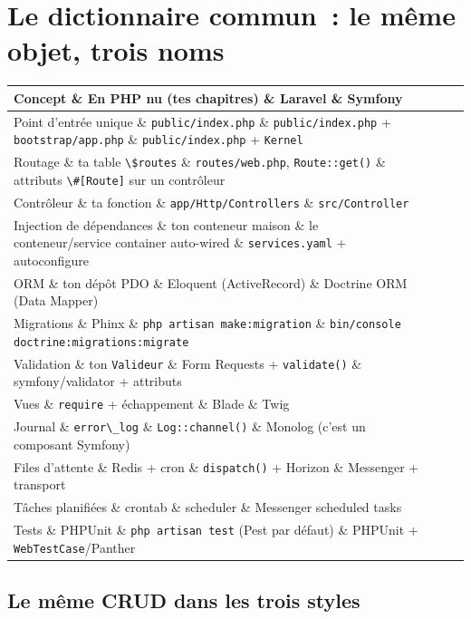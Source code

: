 \documentclass[12pt,a4paper,twoside,openright]{book}
\makeatletter
\newenvironment{tabz}[1]{\rowcolors{2}{white}{tralight}%
  \small\setlength{\tabcolsep}{5pt}\setlength{\LTpre}{3pt}\setlength{\LTpost}{3pt}%
  \begin{longtable}{@{}#1@{}}\toprule}
  {\bottomrule\end{longtable}\normalfont\setlength{\tabcolsep}{6pt}}
\newcommand{\thd}[1]{\textbf{\color{white}#1}}
\newcommand{\headrow}{\rowcolor{theadbg}}
\makeatother
\begin{document}
\section{Le dictionnaire commun~: le m\^eme objet, trois noms}

\begin{tabz}{lXXX}
  \headrow \thd{Concept} \& \thd{En PHP nu (tes chapitres)} \& \thd{Laravel} \& \thd{Symfony} \\
  \midrule
  Point d'entr\'ee unique \& \verb|public/index.php| \& \verb|public/index.php| + \verb|bootstrap/app.php| \& \verb|public/index.php| + \verb|Kernel| \\
  Routage \& ta table \verb|\$routes| \& \verb|routes/web.php|, \verb|Route::get()| \& attributs \verb|\#[Route]| sur un contr\^oleur \\
  Contr\^oleur \& ta fonction \& \verb|app/Http/Controllers| \& \verb|src/Controller| \\
  Injection de d\'ependances \& ton conteneur maison \& le conteneur/service container auto-wired \& \verb|services.yaml| + autoconfigure \\
  ORM \& ton d\'ep\^ot PDO \& Eloquent (ActiveRecord) \& Doctrine ORM (Data Mapper) \\
  Migrations \& Phinx \& \verb|php artisan make:migration| \& \verb|bin/console doctrine:migrations:migrate| \\
  Validation \& ton \verb|Valideur| \& Form Requests + \verb|validate()| \& symfony/validator + attributs \\
  Vues \& \verb|require| + \'echappement \& Blade \& Twig \\
  Journal \& \verb|error\_log| \& \verb|Log::channel()| \& Monolog (c'est un composant Symfony) \\
  Files d'attente \& Redis + cron \& \verb|dispatch()| + Horizon \& Messenger + transport \\
  T\^aches planifi\'ees \& crontab \& scheduler \& Messenger scheduled tasks \\
  Tests \& PHPUnit \& \verb|php artisan test| (Pest par d\'efaut) \& PHPUnit + \verb|WebTestCase|/Panther \\
\end{tabz}

\subsection{Le m\^eme CRUD dans les trois styles}
\end{document}
